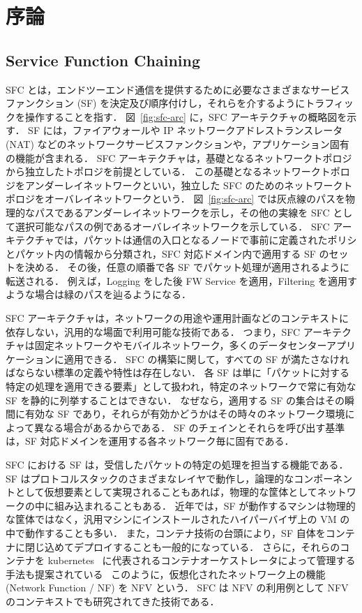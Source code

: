\chapter{序論}
\label{chap:introduction}
\section{Service Function Chaining}
\label{section:sfc}

SFC とは，エンドツーエンド通信を提供するために必要なさまざまなサービスファンクション (SF) を決定及び順序付けし，それらを介するようにトラフィックを操作することを指す．
図~\ref{fig:sfc-arc} に，SFC アーキテクチャの概略図を示す．
SF には，ファイアウォールや IP ネットワークアドレストランスレータ (NAT) などのネットワークサービスファンクションや，アプリケーション固有の機能が含まれる．
SFC アーキテクチャは，基礎となるネットワークトポロジから独立したトポロジを前提としている．
この基礎となるネットワークトポロジをアンダーレイネットワークといい，独立した SFC のためのネットワークトポロジをオーバレイネットワークという．
図~\ref{fig:sfc-arc} では灰点線のパスを物理的なパスであるアンダーレイネットワークを示し，その他の実線を SFC として選択可能なパスの例であるオーバレイネットワークを示している．
SFC アーキテクチャでは，パケットは通信の入口となるノードで事前に定義されたポリシとパケット内の情報から分類され，SFC 対応ドメイン内で適用する SF のセットを決める．
その後，任意の順番で各 SF でパケット処理が適用されるように転送される．
例えば，Logging をした後 FW Service を適用，Filtering を適用すような場合は緑のパスを辿るようになる．

SFC アーキテクチャは，ネットワークの用途や運用計画などのコンテキストに依存しない，汎用的な場面で利用可能な技術である．
つまり，SFC アーキテクチャは固定ネットワークやモバイルネットワーク，多くのデータセンターアプリケーションに適用できる．
SFC の構築に関して，すべての SF が満たさなければならない標準の定義や特性は存在しない．
各 SF は単に「パケットに対する特定の処理を適用できる要素」として扱われ，特定のネットワークで常に有効な SF を静的に列挙することはできない．
なぜなら，適用する SF の集合はその瞬間に有効な SF であり，それらが有効かどうかはその時々のネットワーク環境によって異なる場合があるからである．
SF のチェインとそれらを呼び出す基準は，SF 対応ドメインを運用する各ネットワーク毎に固有である．

SFC における SF は，受信したパケットの特定の処理を担当する機能である．
SF はプロトコルスタックのさまざまなレイヤで動作し，論理的なコンポーネントとして仮想要素として実現されることもあれば，物理的な筐体としてネットワークの中に組み込まれることもある．
近年では，SF が動作するマシンは物理的な筐体ではなく，汎用マシンにインストールされたハイパーバイザ上の VM の中で動作することも多い．
また，コンテナ技術の台頭により，SF 自体をコンテナに閉じ込めてデプロイすることも一般的になっている．
さらに，それらのコンテナを kubernetes~\cite{k8s} に代表されるコンテナオーケストレータによって管理する手法も提案されている~\cite{sfc-with-k8s}
このように，仮想化されたネットワーク上の機能 (Network Function / NF) を NFV という．
SFC は NFV の利用例として NFV のコンテキストでも研究されてきた技術である．

